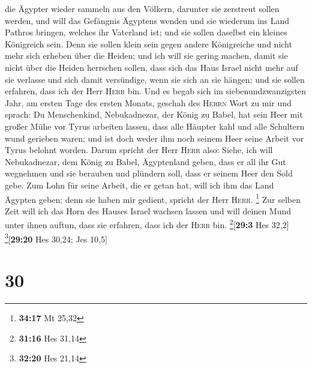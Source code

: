 die Ägypter wieder sammeln aus den Völkern, darunter sie zerstreut
sollen werden,  und will das Gefängnis Ägyptens wenden
und sie wiederum ins Land Pathros bringen, welches ihr Vaterland ist;
und sie sollen daselbst ein kleines Königreich sein. 
Denn sie sollen klein sein gegen andere Königreiche und nicht mehr sich
erheben über die Heiden; und ich will sie gering machen, damit sie nicht
über die Heiden herrschen sollen,  dass sich das Haus
Israel nicht mehr auf sie verlasse und sich damit versündige, wenn sie
sich an sie hängen; und sie sollen erfahren, dass ich der Herr
\textsc{Herr} bin.  Und es begab sich im
siebenundzwanzigsten Jahr, am ersten Tage des ersten Monats, geschah des
\textsc{Herrn} Wort zu mir und sprach:  Du Menschenkind,
Nebukadnezar, der König zu Babel, hat sein Heer mit großer Mühe vor
Tyrus arbeiten lassen, dass alle Häupter kahl und alle Schultern wund
gerieben waren; und ist doch weder ihm noch seinem Heer seine Arbeit vor
Tyrus belohnt worden.  Darum spricht der Herr
\textsc{Herr} also: Siehe, ich will Nebukadnezar, dem König zu Babel,
Ägyptenland geben, dass er all ihr Gut wegnehmen und sie berauben und
plündern soll, dass er seinem Heer den Sold gebe.  Zum
Lohn für seine Arbeit, die er getan hat, will ich ihm das Land Ägypten
geben; denn sie haben mir gedient, spricht der Herr \textsc{Herr}.
\footnote{\textbf{34:17} Mt 25,32}  Zur selben Zeit will
ich das Horn des Hauses Israel wachsen lassen und will deinen Mund unter
ihnen auftun, dass sie erfahren, dass ich der \textsc{Herr} bin.
\footnote{\textbf{31:16} Hes 31,14}{[}\textbf{29:3} Hes 32,2{]}
\footnote{\textbf{32:20} Hes 21,14}{[}\textbf{29:20} Hes 30,24; Jes
10,5{]}

\hypertarget{section-29}{%
\section{30}\label{section-29}}

